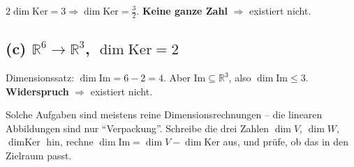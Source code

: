 \documentclass[a4paper,12pt]{article}
\begin{document}
$2 \dim \text{Ker} = 3 \Rightarrow \dim \text{Ker} = \tfrac{3}{2}$. \textbf{Keine ganze Zahl} $\Rightarrow$ existiert nicht.

\subsection*{(c) $\mathbb{R}^6 \to \mathbb{R}^3$, $\dim \text{Ker} = 2$}

Dimensionssatz: $\dim \text{Im} = 6 - 2 = 4$. Aber $\text{Im} \subseteq \mathbb{R}^3$, also $\dim \text{Im} \leq 3$. \textbf{Widerspruch} $\Rightarrow$ existiert nicht.

\begin{merkbox}[title={Muster erkennen}]
Solche Aufgaben sind meistens reine Dimensionsrechnungen -- die linearen Abbildungen sind nur ``Verpackung''. Schreibe die drei Zahlen $\dim V$, $\dim W$, $\dim \text{Ker}$ hin, rechne $\dim \text{Im} = \dim V - \dim \text{Ker}$ aus, und pr\"ufe, ob das in den Zielraum passt.
\end{merkbox}
\end{document}

